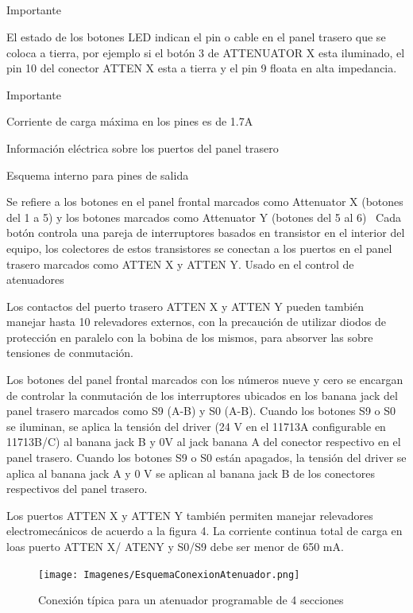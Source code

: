 \subsection{}
Importante

El estado de los botones LED indican el pin o cable en el panel trasero que se coloca a tierra, por ejemplo si el botón
3 de ATTENUATOR X esta iluminado, el pin 10 del conector ATTEN X esta a tierra y el pin 9 floata en alta impedancia.

Importante

Corriente de carga máxima en los pines es de 1.7A

Información eléctrica sobre los puertos del panel trasero	

Esquema interno para pines de salida

Se refiere a los botones en el panel frontal marcados como Attenuator X (botones del 1 a 5) y los botones marcados como
Attenuator Y (botones del 5 al 6) \ Cada botón controla una pareja de interruptores basados en transistor en el
interior del equipo, los colectores de estos transistores se conectan a los puertos en el panel trasero marcados como
ATTEN X y ATTEN Y. Usado en el control de atenuadores

Los contactos del puerto trasero ATTEN X y ATTEN Y pueden también manejar hasta 10 relevadores externos, con la
precaución de utilizar diodos de protección en paralelo con la bobina de los mismos, para absorver las sobre tensiones
de conmutación.

Los botones del panel frontal marcados con los números nueve y cero se encargan de controlar la conmutación de los
interruptores ubicados en los banana jack del panel trasero marcados como S9 (A-B) y S0 (A-B). Cuando los botones S9 o
S0 se iluminan, se aplica la tensión del driver (24 V en el 11713A configurable en 11713B/C) al banana jack B y 0V al
jack banana A del conector respectivo en el panel trasero. Cuando los botones S9 o S0 están apagados, la tensión del
driver se aplica al banana jack A y 0 V se aplican al banana jack B de los conectores respectivos del panel trasero.

Los puertos ATTEN X y ATTEN Y también permiten manejar relevadores electromecánicos de acuerdo a la figura 4. La
corriente continua total de carga en loas puerto ATTEN X/ ATENY y S0/S9 debe ser menor de 650 mA.

\begin{figure}
	\centering
	\begin{minipage}{17.491cm}			
		\texttt{[image: Imagenes/EsquemaConexionAtenuador.png]}
		\caption{Conexión típica para un atenuador programable de 4 secciones}
		\label{Fig:ConexionAtenuador11713}
	\end{minipage}
\end{figure}


